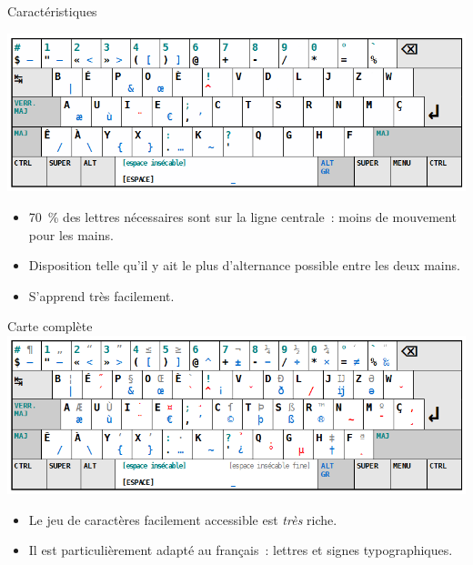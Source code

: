 \begin{frame}{Caractéristiques}

    \centering
    \includegraphics[width=\textwidth]{images/bepo-simple.png}
    \pause

    \begin{itemize}
	\item 70~\% des lettres nécessaires sont sur la ligne centrale~: moins
          de mouvement pour les mains. \pause

        \item Disposition telle qu’il y ait le plus d’alternance possible entre
          les deux mains. \pause

	\item S’apprend très facilement.
    \end{itemize}
\end{frame}

\begin{frame}{Carte complète}
    \centering
    \includegraphics[width=\textwidth]{images/bepo-complete.png}
    \pause

    \begin{itemize}
        \item Le jeu de caractères facilement accessible est \emph{très}
          riche. \pause

        \item Il est particulièrement adapté au français~: lettres et signes
          typographiques.
    \end{itemize}
\end{frame}
